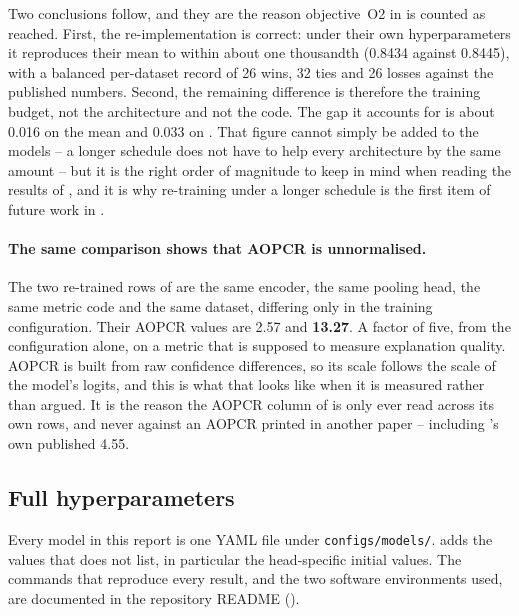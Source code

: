 Two conclusions follow, and they are the reason objective~O2 in  is counted as
reached. First, the re-implementation is correct: under their own hyperparameters it reproduces
their \ucr{} mean to within about one thousandth (0.8434 against 0.8445), with a balanced
per-dataset record of 26 wins, 32 ties and 26 losses against the published numbers. Second, the
remaining difference is therefore the training budget, not the architecture and not the code. The
gap it accounts for is about 0.016 on the \ucr{} mean and 0.033 on \webtraffic{}. That figure cannot
simply be added to the \seanet{} models -- a longer schedule does not have to help every
architecture by the same amount -- but it is the right order of magnitude to keep in mind when
reading the \ucr{} results of , and it is why re-training \seanet{} under a longer
schedule is the first item of future work in .

\paragraph{The same comparison shows that AOPCR is unnormalised.}
The two re-trained rows of  are the same encoder, the same pooling head, the
same metric code and the same dataset, differing only in the training configuration. Their AOPCR
values are 2.57 and \textbf{13.27}. A factor of five, from the configuration alone, on a metric that
is supposed to measure explanation quality. AOPCR is built from raw confidence differences, so its
scale follows the scale of the model's logits, and this is what that looks like when it is measured
rather than argued. It is the reason the AOPCR column of  is only ever read
across its own rows, and never against an AOPCR printed in another paper -- including \millet{}'s
own published 4.55.

\subsection{Full hyperparameters}
\label{app:hparams}

Every model in this report is one YAML file under \texttt{configs/models/}.  adds
the values that  does not list, in particular the head-specific initial values.
The commands that reproduce every result, and the two software environments used, are documented in
the repository README ().

